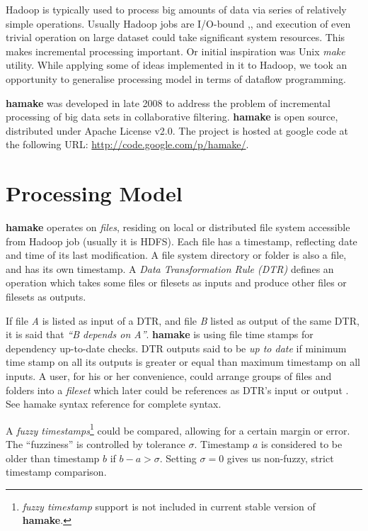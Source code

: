 \documentclass[11pt,twocolumn]{article}
\begin{document}
Hadoop is typically used to process big amounts of data via series of
relatively simple operations. Usually Hadoop jobs are I/O-bound
\cite{hadoopattwitter},\cite{hs2010hadoopbench}, and execution of even
trivial operation on large dataset could take significant system
resources. This makes incremental processing important. Or initial
inspiration was Unix \emph{make} utility. While applying some of ideas
implemented in it to Hadoop, we took an opportunity to generalise
processing model in terms of dataflow programming.

\textbf{hamake} was developed in late 2008 to address the problem of
incremental processing of big data sets in collaborative filtering.
\textbf{hamake} is open source, distributed under Apache License
v2.0. The project is hosted at google code at the following URL:
\url{http://code.google.com/p/hamake/}.

\section{Processing Model}

\textbf{hamake} operates on \textit{files}, residing on local or
distributed file system accessible from Hadoop job (usually it is
HDFS). Each file has a timestamp, reflecting date and time of its last
modification. A file system directory or folder is also a file, and
has its own timestamp. A \textit{Data Transformation Rule (DTR)}
defines an operation which takes some files or filesets as inputs and
produce other files or filesets as outputs.

If file \textit{A} is listed as input of a DTR, and file \textit{B}
listed as output of the same DTR, it is said that \textit{``B depends
  on A''}. \textbf{hamake} is using file time stamps for dependency
up-to-date checks. DTR outputs said to be \textit{up to date} if
minimum time stamp on all its outputs is greater or equal than maximum
timestamp on all inputs. A user, for his or her convenience, could
arrange groups of files and folders into a \emph{fileset} which later
could be references as DTR's input or output . See hamake syntax
reference\cite{hamakesyntax} for complete syntax.

A \textit{fuzzy timestamps}\footnote{\textit{fuzzy timestamp} support
  is not included in current stable version of \textbf{hamake}.}
could be compared, allowing for a certain margin or error. The
``fuzziness'' is controlled by tolerance $\sigma$. Timestamp $a$ is
considered to be older than timestamp $b$ if $b-a>\sigma$. Setting
$\sigma=0$ gives us non-fuzzy, strict timestamp comparison.
\end{document}
